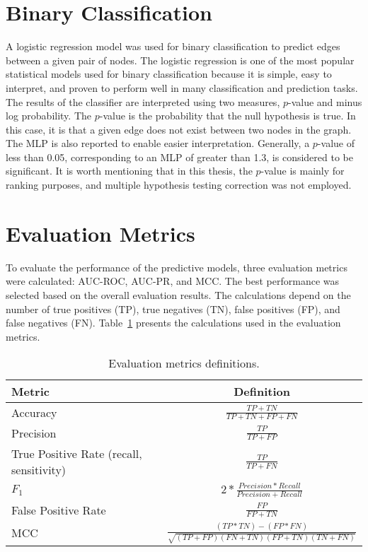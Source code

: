 \section{Binary Classification}

A logistic regression model was used for binary classification to predict edges between a given pair of nodes.
The logistic regression is one of the most popular statistical models used for binary classification because it is simple, easy to interpret, and proven to perform well in many classification and prediction tasks.
The results of the classifier are interpreted using two measures, $p$-value and minus log probability.
The $p$-value is the probability that the null hypothesis is true.
In this case, it is that a given edge does not exist between two nodes in the graph.
The \ac{MLP} is also reported to enable easier interpretation.
Generally, a $p$-value of less than 0.05, corresponding to an \ac{MLP} of greater than 1.3, is considered to be significant.
It is worth mentioning that in this thesis, the $p$-value is mainly for ranking purposes, and multiple hypothesis testing correction was not employed.

\section{Evaluation Metrics}\label{evaluation_section}

To evaluate the performance of the predictive models, three evaluation metrics were calculated: \ac{AUC-ROC}, \ac{AUC-PR}, and \ac{MCC}.
The best performance was selected based on the overall evaluation results.
The calculations depend on the number of true positives (TP), true negatives (TN), false positives (FP), and false negatives (FN).
Table~\ref{tab:evaluation} presents the calculations used in the evaluation metrics.

\begin{table}[ht]
    \centering
    \begin{tabular}{ |l|c| }
        \hline
        \textbf{Metric} & \textbf{Definition} \\
        \hline
        Accuracy & $\frac{TP + TN}{TP + TN + FP + FN}$ \\
        \hline
        Precision & $\frac{TP}{TP + FP}$ \\
        \hline
        True Positive Rate (recall, sensitivity) & $\frac{TP}{TP + FN}$ \\
        \hline
        $F_{1}$ & $2 * \frac{Precision * Recall}{Precision + Recall}$ \\
        \hline
        False Positive Rate & $\frac{FP}{FP + TN}$ \\
        \hline
        MCC & $\frac{(TP*TN)-(FP*FN)}{\sqrt{(TP + FP)(FN + TN)(FP + TN)(TN + FN)}}$ \\
        \hline
    \end{tabular}
    \captionsetup{justification=centering}
    \caption{Evaluation metrics definitions.}
    \label{tab:evaluation}
\end{table}

